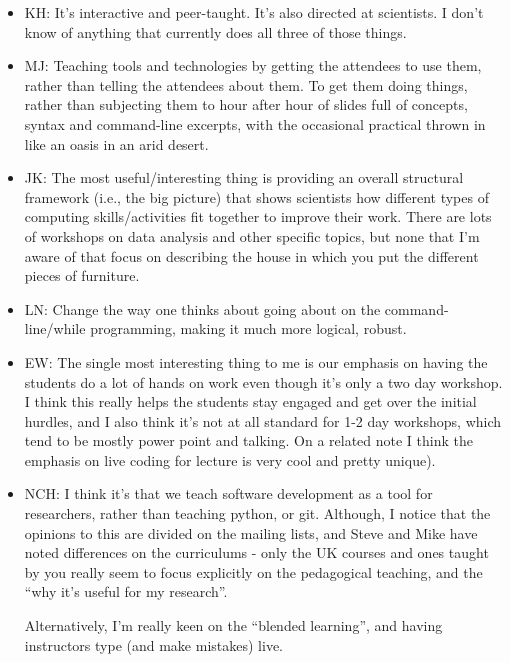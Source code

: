 \documentclass{article}
\begin{document}
\begin{itemize}

  \item KH: It's interactive and peer-taught. It's also directed at scientists. I don't know of anything that currently does all three of those things.

  \item MJ: Teaching tools and technologies by getting the attendees to use them, rather than telling the attendees about them. To get them doing things, rather than subjecting them to hour after hour of slides full of concepts, syntax and command-line excerpts, with the occasional practical thrown in like an oasis in an arid desert.

  \item JK: The most useful/interesting thing is providing an overall structural framework (i.e., the big picture) that shows scientists how different types of computing skills/activities fit together to improve their work. There are lots of workshops on data analysis and other specific topics, but none that I'm aware of that focus on describing the house in which you put the different pieces of furniture.

  \item LN: Change the way one thinks about going about on the command-line/while programming, making it much more logical, robust.

  \item EW: The single most interesting thing to me is our emphasis on having the students do a lot of hands on work even though it's only a two day workshop. I think this really helps the students stay engaged and get over the initial hurdles, and I also think it's not at all standard for 1-2 day workshops, which tend to be mostly power point and talking. On a related note I think the emphasis on live coding for lecture is very cool and pretty unique).

  \item NCH: I think it's that we teach software development as a tool for researchers, rather than teaching python, or git. Although, I notice that the opinions to this are divided on the mailing lists, and Steve and Mike have noted differences on the curriculums - only the UK courses and ones taught by you really seem to focus explicitly on the pedagogical teaching, and the ``why it's useful for my research''.

Alternatively, I'm really keen on the ``blended learning'', and having instructors type (and make mistakes) live.

\end{itemize}
\end{document}
